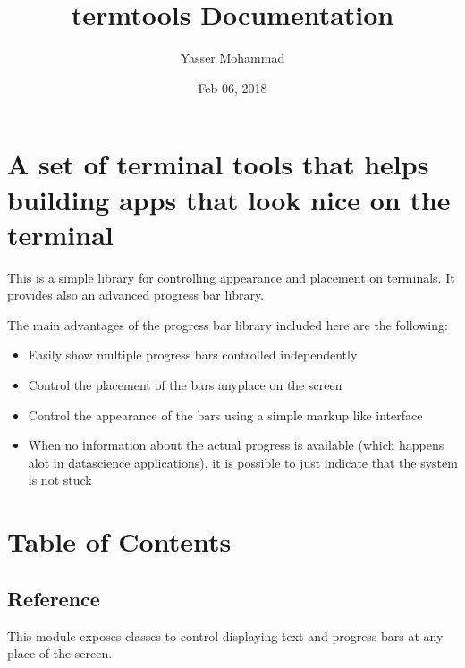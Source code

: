 \documentclass[a4paper,10pt,english]{sphinxmanual}
\title{termtools Documentation}
\date{Feb 06, 2018}
\author{Yasser Mohammad}
\begin{document}
\maketitle
\sphinxtableofcontents
{}\label{\detokenize{index::doc}}



\chapter{A set of terminal tools that helps building apps that look nice on the terminal}
\label{\detokenize{index:welcome-to-termtools-s-documentation}}\label{\detokenize{index:a-set-of-terminal-tools-that-helps-building-apps-that-look-nice-on-the-terminal}}
This is a simple library for controlling  appearance and placement
on terminals. It provides also an advanced progress bar library.

The main advantages of the progress bar library included here are the
following:
\begin{itemize}
\item {} 
Easily show multiple progress bars controlled independently

\item {} 
Control the placement of the bars anyplace on the screen

\item {} 
Control the appearance of the bars using a simple markup like
interface

\item {} 
When no information about the actual progress is available (which
happens alot in datascience applications), it is possible to just
indicate that the system is not stuck

\end{itemize}


\chapter{Table of Contents}
\label{\detokenize{index:table-of-contents}}

\section{Reference}
\label{\detokenize{references::doc}}\label{\detokenize{references:module-termtools.terminal}}\label{\detokenize{references:reference}}
This module exposes classes to control displaying text and progress bars at any place of the screen.
\end{document}
